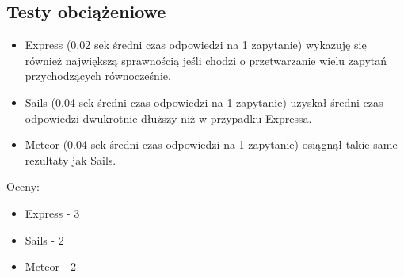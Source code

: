 \documentclass[12pt]{report}
\begin{document}
    \subsection{Testy obciążeniowe}
      \begin{itemize}
        \item Express (0.02 sek średni czas odpowiedzi na 1 zapytanie) wykazuję się również największą sprawnością jeśli chodzi o przetwarzanie wielu zapytań przychodzących równocześnie.
        \item Sails (0.04 sek średni czas odpowiedzi na 1 zapytanie) uzyskał średni czas odpowiedzi dwukrotnie dłuższy niż w przypadku Expressa.
        \item Meteor (0.04 sek średni czas odpowiedzi na 1 zapytanie) osiągnął takie same rezultaty jak Sails.
      \end{itemize}
      Oceny:
      \begin{itemize}
        \item Express - 3
        \item Sails - 2
        \item Meteor - 2
      \end{itemize}
      
\end{document}
